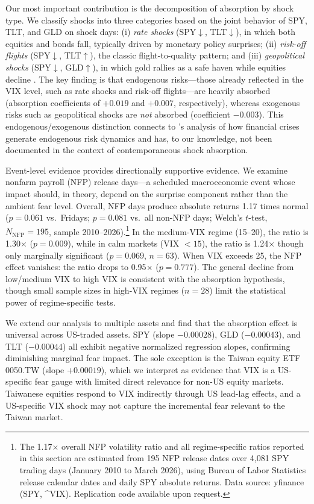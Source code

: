 \documentclass[12pt,a4paper]{article}
\begin{document}
Our most important contribution is the decomposition of absorption by shock type. We classify shocks into three categories based on the joint behavior of SPY, TLT, and GLD on shock days: (i) \textit{rate shocks} (SPY$\downarrow$, TLT$\downarrow$), in which both equities and bonds fall, typically driven by monetary policy surprises; (ii) \textit{risk-off flights} (SPY$\downarrow$, TLT$\uparrow$), the classic flight-to-quality pattern; and (iii) \textit{geopolitical shocks} (SPY$\downarrow$, GLD$\uparrow$), in which gold rallies as a safe haven while equities decline \citep{baur2010}. The key finding is that endogenous risks---those already reflected in the VIX level, such as rate shocks and risk-off flights---are heavily absorbed (absorption coefficients of $+0.019$ and $+0.007$, respectively), whereas exogenous risks such as geopolitical shocks are \textit{not} absorbed (coefficient $-0.003$). This endogenous/exogenous distinction connects to \citet{danielsson2018}'s analysis of how financial crises generate endogenous risk dynamics and has, to our knowledge, not been documented in the context of contemporaneous shock absorption.

Event-level evidence provides directionally supportive evidence. We examine nonfarm payroll (NFP) release days---a scheduled macroeconomic event whose impact should, in theory, depend on the surprise component rather than the ambient fear level. Overall, NFP days produce absolute returns 1.17 times normal ($p = 0.061$ vs.\ Fridays; $p = 0.081$ vs.\ all non-NFP days; Welch's $t$-test, $N_{\text{NFP}} = 195$, sample 2010--2026).\footnote{The 1.17$\times$ overall NFP volatility ratio and all regime-specific ratios reported in this section are estimated from 195 NFP release dates over 4,081 SPY trading days (January 2010 to March 2026), using Bureau of Labor Statistics release calendar dates and daily SPY absolute returns. Data source: yfinance (SPY, \^{}VIX). Replication code available upon request.} In the medium-VIX regime (15--20), the ratio is 1.30$\times$ ($p = 0.009$), while in calm markets (VIX $< 15$), the ratio is 1.24$\times$ though only marginally significant ($p = 0.069$, $n = 63$). When VIX exceeds 25, the NFP effect vanishes: the ratio drops to 0.95$\times$ ($p = 0.777$). The general decline from low/medium VIX to high VIX is consistent with the absorption hypothesis, though small sample sizes in high-VIX regimes ($n = 28$) limit the statistical power of regime-specific tests.

We extend our analysis to multiple assets and find that the absorption effect is universal across US-traded assets. SPY (slope $-0.00028$), GLD ($-0.00043$), and TLT ($-0.00044$) all exhibit negative normalized regression slopes, confirming diminishing marginal fear impact. The sole exception is the Taiwan equity ETF 0050.TW (slope $+0.00019$), which we interpret as evidence that VIX is a US-specific fear gauge with limited direct relevance for non-US equity markets. Taiwanese equities respond to VIX indirectly through US lead-lag effects, and a US-specific VIX shock may not capture the incremental fear relevant to the Taiwan market.
\end{document}

